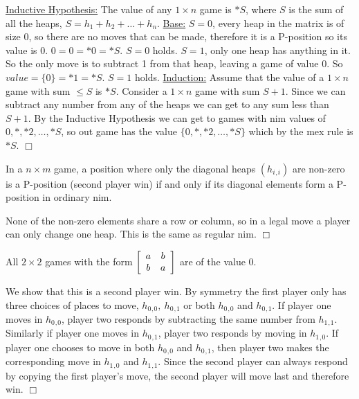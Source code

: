 \documentclass[11pt]{article}
\begin{document}
  \underline{Inductive Hypothesis:} The value of any $1 \times n$ game is $\ast S$, where $S$ is the sum of all the heaps, $S = h_1+h_2+\ldots+h_n$.
\newline\underline{Base:} $S=0$, every heap in the matrix is of size 0, so there are no moves that can be made, therefore it is a P-position so its value is 0.  $0 = 0 = \ast 0 = \ast S$.  $S = 0$ holds.
\newline $S = 1$, only one heap has anything in it.  So the only move is to subtract 1 from that heap, leaving a game of value 0.  So $value = \{0\} = \ast 1 = \ast S$.  $S = 1$ holds.
\newline\underline{Induction:}  Assume that the value of a $1\times n$ game with sum $\leq S$ is $\ast S$.  Consider a $1\times n$ game with sum $S + 1$.  Since we can subtract any number from any of the heaps we can get to any sum less than $S + 1$.  By the Inductive Hypothesis we can get to games with nim values of $0, \ast, \ast 2,\ldots, \ast S$, so out game has the value $\{ 0, \ast, \ast 2,\ldots, \ast S \} $ which by the mex rule is $\ast S$. 
\hfill{$\Box$}

  In a $n \times m$ game, a position where only the diagonal heaps $\left(h_i{}_,{} _i  \right)$ are non-zero is a P-position (second player win) if and only if its diagonal elements form a P-position in ordinary nim.

  None of the non-zero elements share a row or column, so in a legal move a player can only change one heap.  This is the same as regular nim. \hfil{$\Box$}

  All $2 \times 2$ games with the form 
$
\left[
\begin{array}{ c c }
a & b \\
b & a
\end{array}
\right]
$
are of the value 0.

 We show that this is a second player win.  By symmetry the first player only has three choices of places to move, $h_0{}_,{}_0,\: h_0{}_,{}_1$ or both $h_0{}_,{}_0 $ and $ h_0{}_,{}_1$.  If player one moves in $h_0{}_,{}_0$, player two responds by subtracting the same number from $h_1{}_,{}_1$.  Similarly if player one moves in $h_0{}_,{}_1$, player two responds by moving in $h_1{}_,{}_0$.  If player one chooses to move in both $h_0{}_,{}_0 $ and $ h_0{}_,{}_1$, then player two makes the corresponding move in $h_1{}_,{}_0 $ and $ h_1{}_,{}_1$.  Since the second player can always respond by copying the first player's move, the second player will move last and therefore win.
\hfill{$\Box$}
\end{document}
